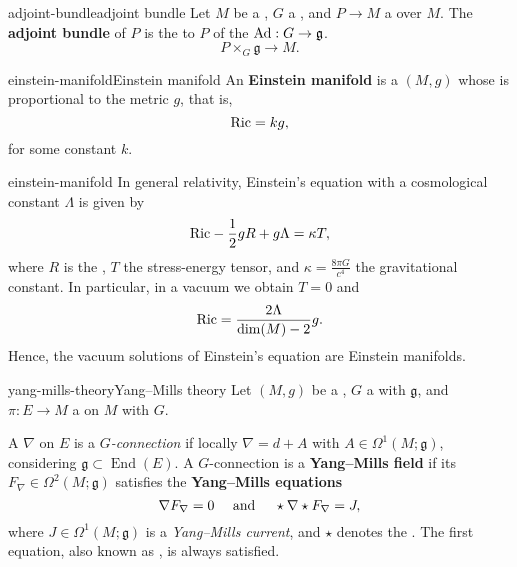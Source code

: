 \begin{topic}{adjoint-bundle}{adjoint bundle}
    Let $M$ be a , $G$ a , and $P \to M$ a  over $M$. The \textbf{adjoint bundle} of $P$ is the  to $P$ of the  $\textup{Ad} : G \to \mathfrak{g}$.
    \[ P \times_G \mathfrak{g} \to M . \]
\end{topic}

\begin{topic}{einstein-manifold}{Einstein manifold}
    An \textbf{Einstein manifold} is a  $(M, g)$ whose  is proportional to the metric $g$, that is,
    \[ \textup{Ric} = kg , \]
    for some constant $k$.
\end{topic}

\begin{example}{einstein-manifold}
    In general relativity, Einstein's equation with a cosmological constant $\Lambda$ is given by
    \[ \textup{Ric} - \frac{1}{2} g R + g \Lambda = \kappa T ,
    \]
    where $R$ is the , $T$ the stress-energy tensor, and $\kappa = \frac{8 \pi G}{c^4}$ the gravitational constant. In particular, in a vacuum we obtain $T = 0$ and
    \[ \textup{Ric} = \frac{2 \Lambda}{\dim(M) - 2} g . \]
    Hence, the vacuum solutions of Einstein's equation are Einstein manifolds.
\end{example}

\begin{topic}{yang-mills-theory}{Yang--Mills theory}
    Let $(M, g)$ be a , $G$ a  with  $\mathfrak{g}$, and $\pi : E \to M$ a  on $M$ with  $G$.

    A  $\nabla$ on $E$ is a \textit{$G$-connection} if locally $\nabla = d + A$ with $A \in \Omega^1(M; \mathfrak{g})$, considering $\mathfrak{g} \subset \operatorname{End}(E)$. A $G$-connection is a \textbf{Yang--Mills field} if its  $F_\nabla \in \Omega^2(M; \mathfrak{g})$ satisfies the \textbf{Yang--Mills equations}
    \[ \nabla F_\nabla = 0 \quad \textup{ and } \quad \star \nabla \star F_\nabla = J , \]
    where $J \in \Omega^1(M; \mathfrak{g})$ is a \textit{Yang--Mills current}, and $\star$ denotes the . The first equation, also known as , is always satisfied.
\end{topic}

